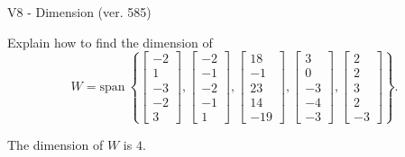 \begin{exercise}
  \begin{exerciseTitle}V8 - Dimension (ver. 585)\end{exerciseTitle}
  \begin{exerciseStatement}
    Explain how to find the dimension of 
\[W=\mathrm{span}\ \left\{\left[\begin{array}{r}
-2 \\
1 \\
-3 \\
-2 \\
3
\end{array}\right] , \left[\begin{array}{r}
-2 \\
-1 \\
-2 \\
-1 \\
1
\end{array}\right] , \left[\begin{array}{r}
18 \\
-1 \\
23 \\
14 \\
-19
\end{array}\right] , \left[\begin{array}{r}
3 \\
0 \\
-3 \\
-4 \\
-3
\end{array}\right] , \left[\begin{array}{r}
2 \\
2 \\
3 \\
2 \\
-3
\end{array}\right]\right\}.\]



  \end{exerciseStatement}
  \begin{exerciseAnswer}
   The dimension of \(W\) is  \(4\).
  


  \end{exerciseAnswer}
\end{exercise}